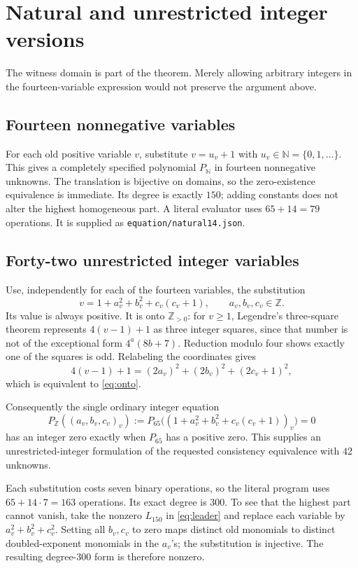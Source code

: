 \documentclass[11pt,letterpaper]{article}
\theoremstyle{definition}
\newcommand{\Z}{\mathbb Z}
\newcommand{\N}{\mathbb N}
\newcommand{\Zp}{\mathbb Z_{>0}}
\newcommand{\code}[1]{\texttt{\small #1}}
\begin{document}
\section{Natural and unrestricted integer versions}
\label{sec:domains}

The witness domain is part of the theorem. Merely allowing arbitrary
integers in the fourteen-variable expression would not preserve the
argument above.

\subsection{Fourteen nonnegative variables}

For each old positive variable \(v\), substitute \(v=u_v+1\) with
\(u_v\in\N=\{0,1,\ldots\}\). This gives a completely specified polynomial
\(P_{\N}\) in fourteen nonnegative unknowns. The translation is bijective
on domains, so the zero-existence equivalence is immediate.
Its degree is exactly \(150\); adding constants does not alter the
highest homogeneous part. A literal evaluator uses \(65+14=79\)
operations. It is supplied as \code{equation/natural14.json}.

\subsection{Forty-two unrestricted integer variables}

Use, independently for each of the fourteen variables, the substitution
\begin{equation}\label{eq:onto}
 v=1+a_v^2+b_v^2+c_v(c_v+1),
 \qquad a_v,b_v,c_v\in\Z.
\end{equation}
Its value is always positive. It is onto \(\Zp\): for \(v\ge1\),
Legendre's three-square theorem represents
\(4(v-1)+1\) as three integer squares, since that number is not of
the exceptional form \(4^a(8b+7)\). Reduction modulo four shows exactly
one of the squares is odd. Relabeling the coordinates gives
\[
 4(v-1)+1=(2a_v)^2+(2b_v)^2+(2c_v+1)^2,
\]
which is equivalent to \eqref{eq:onto}.

Consequently the single ordinary integer equation
\[
 \boxed{P_{\Z}((a_v,b_v,c_v)_v)
       :=P_{65}\bigl((1+a_v^2+b_v^2+c_v(c_v+1))_v\bigr)=0}
\]
has an integer zero exactly when \(P_{65}\) has a positive zero.
This supplies an unrestricted-integer formulation of the requested
consistency equivalence with \(42\) unknowns.

Each substitution costs seven binary operations, so the literal program
uses \(65+14\cdot7=163\) operations. Its exact degree is \(300\).
To see that the highest part cannot vanish, take the nonzero
\(L_{150}\) in \eqref{eq:leader} and replace each variable by
\(a_v^2+b_v^2+c_v^2\). Setting all \(b_v,c_v\) to zero maps distinct
old monomials to distinct doubled-exponent monomials in the \(a_v\)'s;
the substitution is injective. The resulting degree-\(300\) form is
therefore nonzero.
\end{document}
